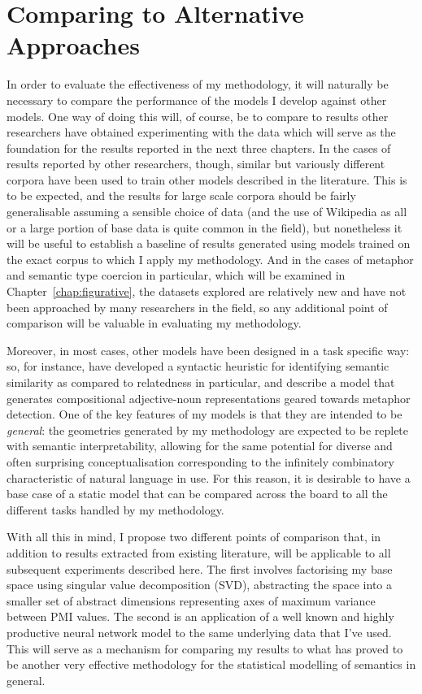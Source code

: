 \section{Comparing to Alternative Approaches}
In order to evaluate the effectiveness of my methodology, it will naturally be necessary to compare the performance of the models I develop against other models.  One way of doing this will, of course, be to compare to results other researchers have obtained experimenting with the data which will serve as the foundation for the results reported in the next three chapters.  In the cases of results reported by other researchers, though, similar but variously different corpora have been used to train other models described in the literature.  This is to be expected, and the results for large scale corpora should be fairly generalisable assuming a sensible choice of data (and the use of Wikipedia as all or a large portion of base data is quite common in the field), but nonetheless it will be useful to establish a baseline of results generated using models trained on the exact corpus to which I apply my methodology.  And in the cases of metaphor and semantic type coercion in particular, which will be examined in Chapter~\ref{chap:figurative}, the datasets explored are relatively new and have not been approached by many researchers in the field, so any additional point of comparison will be valuable in evaluating my methodology.

Moreover, in most cases, other models have been designed in a task specific way: so, for instance, \cite{SchwartzEA2015} have developed a syntactic heuristic for identifying semantic similarity as compared to relatedness in particular, and \cite{GutierrezEA2016} describe a model that generates compositional adjective-noun representations geared towards metaphor detection.  One of the key features of my models is that they are intended to be \emph{general}: the geometries generated by my methodology are expected to be replete with semantic interpretability, allowing for the same potential for diverse and often surprising conceptualisation corresponding to the infinitely combinatory characteristic of natural language in use.  For this reason, it is desirable to have a base case of a static model that can be compared across the board to all the different tasks handled by my methodology.

With all this in mind, I propose two different points of comparison that, in addition to results extracted from existing literature, will be applicable to all subsequent experiments described here.  The first involves factorising my base space using singular value decomposition (SVD), abstracting the space into a smaller set of abstract dimensions representing axes of maximum variance between PMI values.  The second is an application of a well known and highly productive neural network model to the same underlying data that I've used.  This will serve as a mechanism for comparing my results to what has proved to be another very effective methodology for the statistical modelling of semantics in general.

